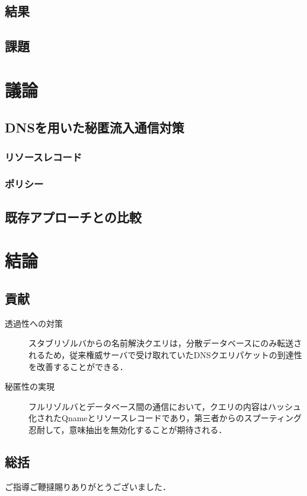\documentclass[12pt]{jarticle} %
\begin{document}
\subsection{結果}
\subsection{課題}

\newpage
\section{議論}
\subsection{DNSを用いた秘匿流入通信対策}
\subsubsection{リソースレコード}
\subsubsection{ポリシー}
\subsection{既存アプローチとの比較}

\newpage
\section{結論}
\subsection{貢献}
\begin{description}
 \item[透過性への対策] スタブリゾルバからの名前解決クエリは，分散データベースにのみ転送されるため，従来権威サーバで受け取れていたDNSクエリパケットの到達性を改善することができる．
 \item[秘匿性の実現] フルリゾルバとデータベース間の通信において，クエリの内容はハッシュ化されたQnameとリソースレコードであり，第三者からのスプーティング忍耐して，意味抽出を無効化することが期待される．
\end{description}

\subsection{総括}

\newpage
\acknowledgements
ご指導ご鞭撻賜りありがとうございました．
\end{document}
